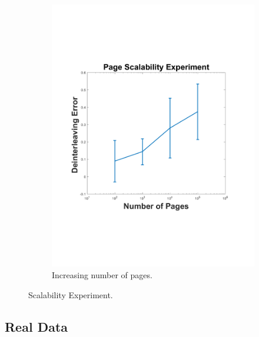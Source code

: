 \begin{figure}
\begin{subfigure}[b]{0.45\textwidth}
		\includegraphics[width=\textwidth]{./img/incpages2}
		\caption{Increasing number of pages.}
		\label{fig:incpages}
	\end{subfigure}
	\caption{Scalability Experiment.}%
	\end{figure}
	
	\subsection{Real Data}
	
	
	
	
	
